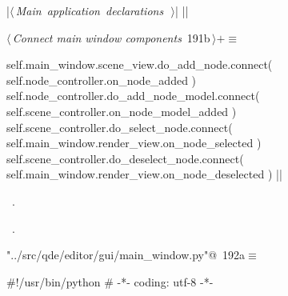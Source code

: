 \documentclass[%
    a4paper,    %
    justified,  %
    nobib,      %
    openany     %
]{tufte-book}
\makeatletter
\renewcommand{\label}[1]{\@tufte@label{##1}}%
\makeatother
\begin{document}
\begin{fullwidth}
\begin{flushleft}
\begin{minipage}{\linewidth}
\begin{pythoncode}
|\hbox{$\langle\,${\itshape Main application declarations}\nobreak\ {\footnotesize {}}$\,\rangle$}|
|\NWsep|
\end{pythoncode}
\vspace{1.5ex}
\footnotesize
\begin{list}{}{\setlength{\itemsep}{-\parsep}\setlength{\itemindent}{-\leftmargin}}

\item{}
\end{list}
\end{minipage}\vspace{4ex}
\end{flushleft}
\begin{flushleft} \small
\begin{minipage}{\linewidth}\label{scrap174}\raggedright\small
{} $\langle\,${\itshape Connect main window components}\nobreak\ {\footnotesize {191b}}$\,\rangle+\equiv$
\vspace{-1ex}
\begin{pythoncode}
self.main_window.scene_view.do_add_node.connect(
    self.node_controller.on_node_added
)
self.node_controller.do_add_node_model.connect(
    self.scene_controller.on_node_model_added
)
self.scene_controller.do_select_node.connect(
    self.main_window.render_view.on_node_selected
)
self.scene_controller.do_deselect_node.connect(
    self.main_window.render_view.on_node_deselected
)
|\NWsep|
\end{pythoncode}
\vspace{1.5ex}
\footnotesize
\begin{list}{}{\setlength{\itemsep}{-\parsep}\setlength{\itemindent}{-\leftmargin}}
\item \NWtxtMacroDefBy\ .
\item \NWtxtMacroRefIn\ .

\item{}
\end{list}
\end{minipage}\vspace{4ex}
\end{flushleft}

\begin{flushleft} \small
\begin{minipage}{\linewidth}\label{scrap175}\raggedright\small
{} \verb@"../src/qde/editor/gui/main_window.py"@\nobreak\ {\footnotesize {192a}}$\equiv$
\vspace{-1ex}
\begin{pythoncode}
#!/usr/bin/python
# -*- coding: utf-8 -*-


\end{pythoncode}
\end{minipage}
\end{flushleft}
\end{fullwidth}
\end{document}
